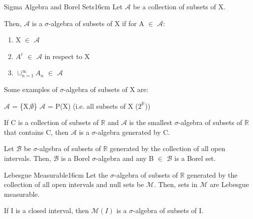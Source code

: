     \begin{definition}{Sigma Algebra and Borel Sets}{16cm}
        Let $\mathcal{A}$ be a collection of subsets of X.

        Then, $\mathcal{A}$ is a {\color{lblue} $\sigma$-algebra}
        of subsets of X if for A $\in$ $\mathcal{A}$:

        \begin{enumerate}[label=(\alph*), itemsep=1.5cm, itemsep=0.1cm]
            \item X $\in$ $\mathcal{A}$
            
            \item $A^c$ $\in$ $\mathcal{A}$ in respect to X
            
            \item $\cup_{n=1}^{\infty} A_n$ $\in$ $\mathcal{A}$
        \end{enumerate}

        Some examples of $\sigma$-algebra of subsets of X are:

        \hspace{0.5cm}
        $\mathcal{A}$ = \{X,$\emptyset$\}
        \hspace{1cm}
        $\mathcal{A}$ = P(X) (i.e. all subsets of X ($2^{\mathbb{R}}$))

        \vspace{0.3cm}

        If C is a collection of subsets of $\mathbb{R}$
        and $\mathcal{A}$ is the smallest $\sigma$-algebra of subsets
        of $\mathbb{R}$ that contains C, then $\mathcal{A}$
        is a $\sigma$-algebra generated by C.

        Let $\mathcal{B}$ be $\sigma$-algebra of subsets of $\mathbb{R}$
        generated by the collection of all open intervals.
        Then, $\mathcal{B}$ is a {\color{lblue} Borel $\sigma$-algebra}
        and any B $\in$ $\mathcal{B}$ is a Borel set.
    \end{definition}

    \vspace{0.5cm}



    \begin{definition}{Lebesgue Measurable}{16cm}
        Let the $\sigma$-algebra of subsets of $\mathbb{R}$ generated by
        the collection of all open intervals and null sets be $\mathcal{M}$.
        Then, sets in $\mathcal{M}$ are {\color{lblue} Lebesgue measurable}.

        If I is a closed interval, then $\mathcal{M}(I)$
        is a $\sigma$-algebra of subsets of I.
    \end{definition}

